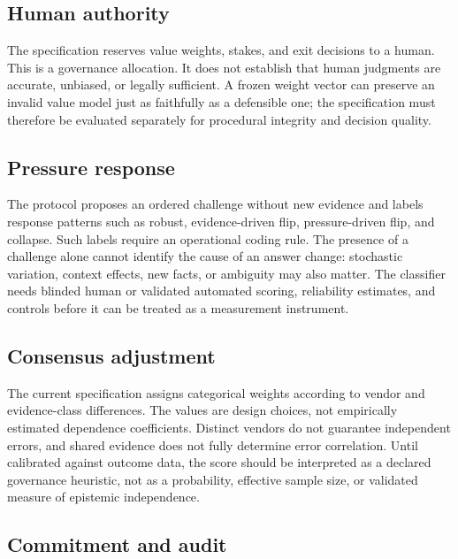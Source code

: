 \documentclass[
  english,
]{article}
\begin{document}
\subsection{Human authority}\label{human-authority}

The specification reserves value weights, stakes, and exit decisions to
a human. This is a governance allocation. It does not establish that
human judgments are accurate, unbiased, or legally sufficient. A frozen
weight vector can preserve an invalid value model just as faithfully as
a defensible one; the specification must therefore be evaluated
separately for procedural integrity and decision quality.

\subsection{Pressure response}\label{pressure-response}

The protocol proposes an ordered challenge without new evidence and
labels response patterns such as robust, evidence-driven flip,
pressure-driven flip, and collapse. Such labels require an operational
coding rule. The presence of a challenge alone cannot identify the cause
of an answer change: stochastic variation, context effects, new facts,
or ambiguity may also matter. The classifier needs blinded human or
validated automated scoring, reliability estimates, and controls before
it can be treated as a measurement instrument.

\subsection{Consensus adjustment}\label{consensus-adjustment}

The current specification assigns categorical weights according to
vendor and evidence-class differences. The values are design choices,
not empirically estimated dependence coefficients. Distinct vendors do
not guarantee independent errors, and shared evidence does not fully
determine error correlation. Until calibrated against outcome data, the
score should be interpreted as a declared governance heuristic, not as a
probability, effective sample size, or validated measure of epistemic
independence.

\subsection{Commitment and audit}\label{commitment-and-audit}
\end{document}
